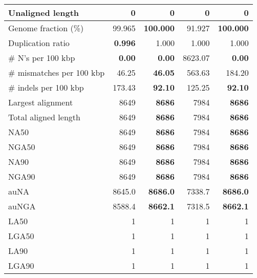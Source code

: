 \documentclass[12pt,a4paper]{article}
\begin{document}
\begin{table}[ht]
\begin{center}
\begin{tabular}{|l*{4}{|r}|}
Unaligned length & 0 & 0 & 0 & 0 \\ \hline
Genome fraction (\%) & 99.965 & {\bf 100.000} & 91.927 & {\bf 100.000} \\ \hline
Duplication ratio & {\bf 0.996} & 1.000 & 1.000 & 1.000 \\ \hline
\# N's per 100 kbp & {\bf 0.00} & {\bf 0.00} & 8623.07 & {\bf 0.00} \\ \hline
\# mismatches per 100 kbp & 46.25 & {\bf 46.05} & 563.63 & 184.20 \\ \hline
\# indels per 100 kbp & 173.43 & {\bf 92.10} & 125.25 & {\bf 92.10} \\ \hline
Largest alignment & 8649 & {\bf 8686} & 7984 & {\bf 8686} \\ \hline
Total aligned length & 8649 & {\bf 8686} & 7984 & {\bf 8686} \\ \hline
NA50 & 8649 & {\bf 8686} & 7984 & {\bf 8686} \\ \hline
NGA50 & 8649 & {\bf 8686} & 7984 & {\bf 8686} \\ \hline
NA90 & 8649 & {\bf 8686} & 7984 & {\bf 8686} \\ \hline
NGA90 & 8649 & {\bf 8686} & 7984 & {\bf 8686} \\ \hline
auNA & 8645.0 & {\bf 8686.0} & 7338.7 & {\bf 8686.0} \\ \hline
auNGA & 8588.4 & {\bf 8662.1} & 7318.5 & {\bf 8662.1} \\ \hline
LA50 & 1 & 1 & 1 & 1 \\ \hline
LGA50 & 1 & 1 & 1 & 1 \\ \hline
LA90 & 1 & 1 & 1 & 1 \\ \hline
LGA90 & 1 & 1 & 1 & 1 \\ \hline
\end{tabular}
\end{center}
\end{table}
\end{document}
